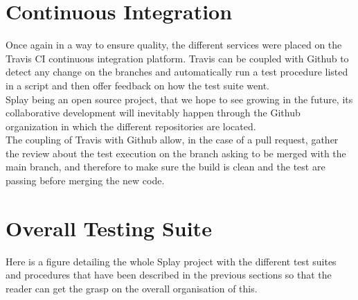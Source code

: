 \documentclass{eplmastersthesis}
\begin{document}
    \section{Continuous Integration}

      Once again in a way to ensure quality, the different services were placed
      on the Travis CI \cite{travis} continuous integration platform. Travis
      can be coupled with Github to detect any change on the branches and
      automatically run a test procedure listed in a script and then offer
      feedback on how the test suite went.\\

      Splay being an open source project, that we hope to see growing in the
      future, its collaborative development will inevitably happen through
      the Github organization in which the different repositories are located.\\
      The coupling of Travis with Github allow, in the case of a pull request,
      gather the review about the test execution on the branch asking to be
      merged with the main branch, and therefore to make sure the build is
      clean and the test are passing before merging the new code.

    \section{Overall Testing Suite}

      Here is a figure detailing the whole Splay project with the different
      test suites and procedures that have been described in the previous
      sections so that the reader can get the grasp on the overall
      organisation of this.
\end{document}
